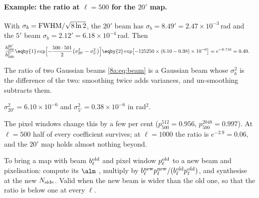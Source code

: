 \paragraph{Example: the ratio at $\ell=500$ for the $20'$ map.} With $\sigma_b={\rm FWHM}/\sqrt{8\ln2}$, the $20'$
beam has $\sigma_b=8.49'=2.47\times10^{-3}$\,rad and the $5'$ beam $\sigma_b=2.12'=6.18\times10^{-4}$\,rad. Then
\begin{align*}
  \frac{b^{20'}_{500}}{b^{5'}_{500}}
  &\eqby{1}\exp\Bigl[-\frac{500\cdot501}{2}\bigl(\sigma_{20'}^2-\sigma_{5'}^2\bigr)\Bigr]
   \eqby{2}\exp\bigl[-125250\times(6.10-0.38)\times10^{-6}\bigr]
   =e^{-0.716}=0.49 .
\end{align*}
\begin{explain}
  \item The ratio of two Gaussian beams \eqref{8a:eq:beam} is a Gaussian beam whose $\sigma_b^2$ is the difference
        of the two: smoothing twice adds variances, and un-smoothing subtracts them.
  \item $\sigma_{20'}^2=6.10\times10^{-6}$ and $\sigma_{5'}^2=0.38\times10^{-6}$ in rad$^2$.
\end{explain}
The pixel windows change this by a few per cent ($p^{512}_{500}=0.956$, $p^{2048}_{500}=0.997$).
At $\ell=500$ half of every coefficient survives; at $\ell=1000$ the ratio is $e^{-2.9}=0.06$, and the $20'$ map
holds almost nothing beyond.

\begin{workdef}
To bring a map with beam $b^{\rm old}_\ell$ and pixel window $p^{\rm old}_\ell$ to a new beam and pixelisation:
compute its $\alm$ ,
multiply by $b^{\rm new}_\ell p^{\rm new}_\ell/(b^{\rm old}_\ell p^{\rm old}_\ell)$, and synthesise at the new
$N_{\rm side}$. Valid when the new beam is wider than the old one, so that the ratio is below one at every
$\ell$.
\end{workdef}

